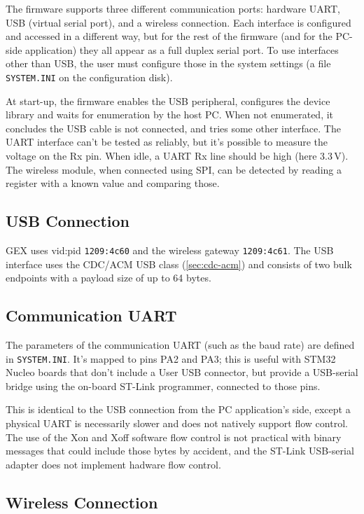 The firmware supports three different communication ports: hardware UART, USB (virtual serial port), and a wireless connection. Each interface is configured and accessed in a different way, but for the rest of the firmware (and for the PC-side application) they all appear as a full duplex serial port. To use interfaces other than USB, the user must configure those in the system settings (a file \verb|SYSTEM.INI| on the configuration disk).

At start-up, the firmware enables the USB peripheral, configures the device library and waits for enumeration by the host PC. When not enumerated, it concludes the USB cable is not connected, and tries some other interface. The UART interface can't be tested as reliably, but it's possible to measure the voltage on the Rx pin. When idle, a UART Rx line should be high (here 3.3\,V). The wireless module, when connected using SPI, can be detected by reading a register with a known value and comparing those.

\subsection{USB Connection}

GEX uses vid:pid \verb|1209:4c60| and the wireless gateway \verb|1209:4c61|. The USB interface uses the CDC/ACM USB class (\ref{sec:cdc-acm}) and consists of two bulk endpoints with a payload size of up to 64 bytes.

\subsection{Communication UART}

The parameters of the communication UART (such as the baud rate) are defined in \verb|SYSTEM.INI|. It's mapped to pins PA2 and PA3; this is useful with STM32 Nucleo boards that don't include a User USB connector, but provide a USB-serial bridge using the on-board ST-Link programmer, connected to those pins. 

This is identical to the USB connection from the PC application's side, except a physical UART is necessarily slower and does not natively support flow control. The use of the Xon and Xoff software flow control is not practical with binary messages that could include those bytes by accident, and the ST-Link USB-serial adapter does not implement hadware flow control.

\subsection{Wireless Connection}

